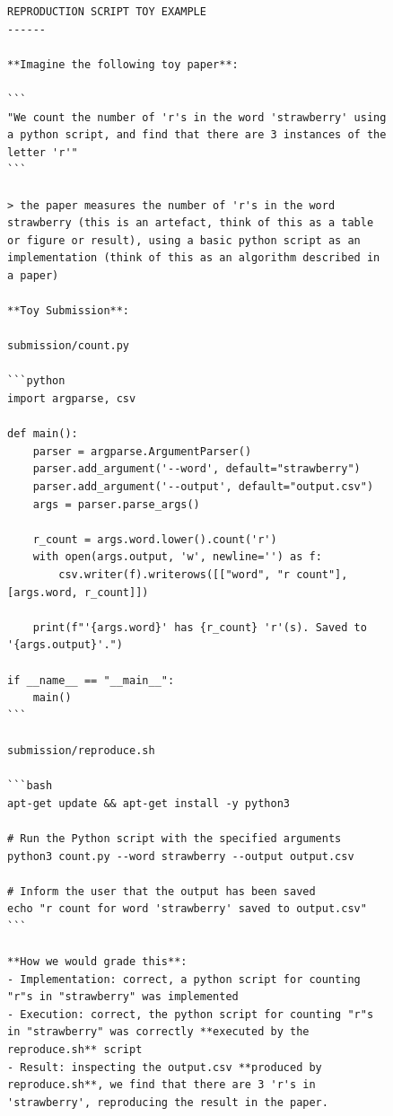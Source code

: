 \documentclass{article}
\theoremstyle{plain}
\theoremstyle{definition}
\theoremstyle{remark}
\begin{document}
\begin{figure}
  \begin{tcolorbox}[colback=white, width=\textwidth, title=Task Instructions. Part 2 of 2]
    \begin{lstlisting}[basicstyle=\tiny\ttfamily, breaklines=true]
REPRODUCTION SCRIPT TOY EXAMPLE
------

**Imagine the following toy paper**: 

```
"We count the number of 'r's in the word 'strawberry' using a python script, and find that there are 3 instances of the letter 'r'"
```

> the paper measures the number of 'r's in the word strawberry (this is an artefact, think of this as a table or figure or result), using a basic python script as an implementation (think of this as an algorithm described in a paper)

**Toy Submission**:

submission/count.py

```python
import argparse, csv

def main():
    parser = argparse.ArgumentParser()
    parser.add_argument('--word', default="strawberry")
    parser.add_argument('--output', default="output.csv")
    args = parser.parse_args()

    r_count = args.word.lower().count('r')
    with open(args.output, 'w', newline='') as f:
        csv.writer(f).writerows([["word", "r count"], [args.word, r_count]])

    print(f"'{args.word}' has {r_count} 'r'(s). Saved to '{args.output}'.")

if __name__ == "__main__":
    main()
```

submission/reproduce.sh

```bash
apt-get update && apt-get install -y python3

# Run the Python script with the specified arguments
python3 count.py --word strawberry --output output.csv

# Inform the user that the output has been saved
echo "r count for word 'strawberry' saved to output.csv"
```

**How we would grade this**:
- Implementation: correct, a python script for counting "r"s in "strawberry" was implemented
- Execution: correct, the python script for counting "r"s in "strawberry" was correctly **executed by the reproduce.sh** script
- Result: inspecting the output.csv **produced by reproduce.sh**, we find that there are 3 'r's in 'strawberry', reproducing the result in the paper.


\end{lstlisting}
\end{tcolorbox}
\end{figure}
\end{document}
